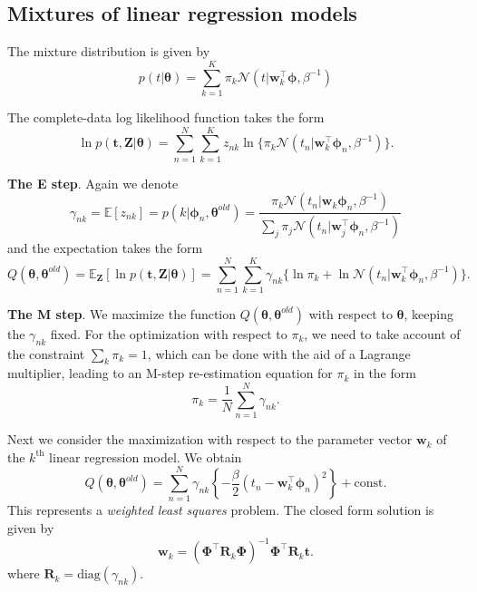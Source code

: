 \documentclass[a4paper]{book}
\newcommand{\up}{\mathrm}
\renewcommand{\bf}{\mathbf}
\renewcommand{\cal}{\mathcal}
\newcommand{\bb}{\mathbb}
\newcommand{\imp}[1]{\textit{#1}}
\newcommand{\bs}{\boldsymbol}
\begin{document}
\subsection{Mixtures of linear regression models}
The mixture distribution is given by
\begin{equation}
	p(t|\bs{\theta}) = \sum_{k=1}^K \pi_k \cal{N}(t|\bf{w}_k^{\intercal} \bs{\phi},\beta^{-1})
\end{equation}

The complete-data log likelihood function takes the form
\begin{equation}
	\ln p(\bf{t,Z}|\bs{\theta}) = \sum_{n=1}^N \sum_{k=1}^K z_{nk}\ln \{ \pi_k \cal{N}(t_n|\bf{w}_k^{\intercal} \bs{\phi}_n,\beta^{-1}) \}.
\end{equation}

\textbf{The E step}. Again we denote
\begin{equation}
	\gamma_{nk} = \bb{E}[z_{nk}] = p(k|\bs{\phi}_n,\bs{\theta}^{old}) = \frac{\pi_k \cal{N}(t_n|\bf{w}_k\bs{\phi}_n,\beta^{-1})}{\sum_j \pi_j \cal{N}(t_n|\bf{w}_j^{\intercal} \bs{\phi}_n,\beta^{-1})}
\end{equation}
and the expectation takes the form
\begin{equation}
	Q(\bs{\theta},\bs{\theta}^{old}) = \bb{E}_{\bf{Z}}[\ln p(\bf{t,Z}|\bs{\theta})] = \sum_{n=1}^N \sum_{k=1}^K \gamma_{nk}\{ \ln \pi_k + \ln \cal{N}(t_n|\bf{w}_k^{\intercal}\bs{\phi}_n,\beta^{-1}) \}.
\end{equation}

\textbf{The M step}. We maximize the function $Q(\bs{\theta},\bs{\theta}^{old})$ with respect to $\bs{\theta}$, keeping the $\gamma_{nk}$ fixed. For the optimization with respect to $\pi_k$, we need to take account of the constraint $\sum_k \pi_k=1$, which can be done with the aid of a Lagrange multiplier, leading to an M-step re-estimation equation for $\pi_k$ in the form
\begin{equation}
	\pi_k = \frac{1}{N} \sum_{n=1}^N \gamma_{nk}.
\end{equation}

Next we consider the maximization with respect to the parameter vector $\bf{w}_k$ of the $k^{\up{th}}$ linear regression model. We obtain
\begin{equation}
	Q(\bs{\theta},\bs{\theta}^{old}) = \sum_{n=1}^N \gamma_{nk} \left\{ -\frac{\beta}{2} (t_n - \bf{w}_k^{\intercal} \bs{\phi}_n)^2 \right\} + \up{const}.
\end{equation}
This represents a \imp{weighted least squares} problem. The closed form solution is given by
\begin{equation}
	\bf{w}_k = (\bs{\Phi}^{\intercal} \bf{R}_k \bs{\Phi})^{-1} \bs{\Phi}^{\intercal} \bf{R}_k \bf{t}.
\end{equation}
where $\bf{R}_k = \up{diag}(\gamma_{nk})$.
\end{document}
